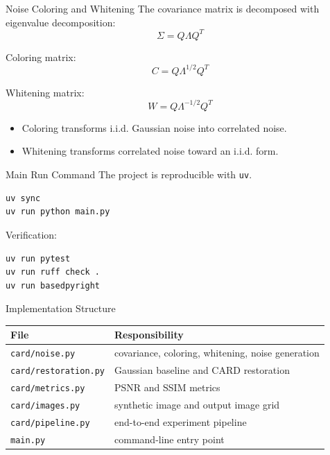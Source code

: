 \documentclass[aspectratio=169]{beamer}
\begin{document}
\begin{frame}{Noise Coloring and Whitening}
  The covariance matrix is decomposed with eigenvalue decomposition:
  \[
    \Sigma = Q \Lambda Q^T
  \]

  Coloring matrix:
  \[
    C = Q \Lambda^{1/2} Q^T
  \]

  Whitening matrix:
  \[
    W = Q \Lambda^{-1/2} Q^T
  \]

  \begin{itemize}
    \item Coloring transforms i.i.d. Gaussian noise into correlated noise.
    \item Whitening transforms correlated noise toward an i.i.d. form.
  \end{itemize}
\end{frame}

\begin{frame}[fragile]{Main Run Command}
  The project is reproducible with \texttt{uv}.

  \begin{lstlisting}[language=bash]
uv sync
uv run python main.py
  \end{lstlisting}

  Verification:

  \begin{lstlisting}[language=bash]
uv run pytest
uv run ruff check .
uv run basedpyright
  \end{lstlisting}
\end{frame}

\begin{frame}{Implementation Structure}
  \begin{table}
    \centering
    \begin{tabular}{ll}
      \toprule
      File & Responsibility \\
      \midrule
      \texttt{card/noise.py} & covariance, coloring, whitening, noise generation \\
      \texttt{card/restoration.py} & Gaussian baseline and CARD restoration \\
      \texttt{card/metrics.py} & PSNR and SSIM metrics \\
      \texttt{card/images.py} & synthetic image and output image grid \\
      \texttt{card/pipeline.py} & end-to-end experiment pipeline \\
      \texttt{main.py} & command-line entry point \\
      \bottomrule
    \end{tabular}
  \end{table}
\end{frame}
\end{document}
